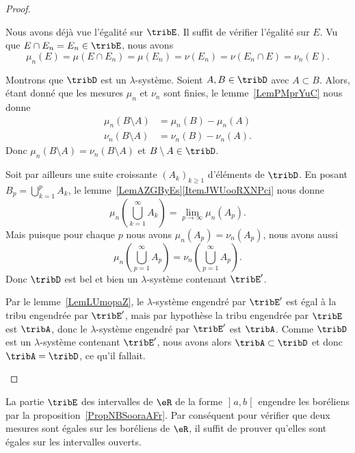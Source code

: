 \begin{proof}
\begin{subproof}
		\spitem[\( \mu_n=\nu_n\) sur \( \tribE'\)]
		Nous avons déjà vue l'égalité sur \( \tribE\). Il suffit de vérifier l'égalité sur \( E\). Vu que \( E\cap E_n=E_n\in\tribE\), nous avons
		\begin{equation}
			\mu_n(E)=\mu(E\cap E_n)=\mu(E_n)=\nu(E_n)=\nu(E_n\cap E)=\nu_n(E).
		\end{equation}

		Montrons que \( \tribD\) est un \( \lambda\)-système. Soient \( A,B\in\tribD\) avec \( A\subset B\). Alors, étant donné que les mesures \( \mu_n\) et \( \nu_n\) sont finies, le lemme~\ref{LemPMprYuC} nous donne
		\begin{subequations}
			\begin{align}
				\mu_n(B\setminus A) & =\mu_n(B)-\mu_n(A)  \\
				\nu_n(B\setminus A) & =\nu_n(B)-\nu_n(A).
			\end{align}
		\end{subequations}
		Donc \( \mu_n(B\setminus A)=\nu_n(B\setminus A)\) et \( B\setminus A\in\tribD\).

		Soit par ailleurs une suite croissante \( (A_k)_{k\geq 1}\) d'éléments de \( \tribD\). En posant \( B_p=\bigcup_{k=1}^pA_k\), le lemme~\ref{LemAZGByEs}\ref{ItemJWUooRXNPci} nous donne
		\begin{equation}
			\mu_n(\bigcup_{k=1}^{\infty}A_k)=\lim_{p\to \infty} \mu_n(A_p).
		\end{equation}
		Mais puisque pour chaque \( p\) nous avons \( \mu_n(A_p)=\nu_n(A_p)\), nous avons aussi
		\begin{equation}
			\mu_n(\bigcup_{p=1}^{\infty}A_p)=\nu_n(\bigcup_{p=1}^{\infty}A_p).
		\end{equation}
		Donc \( \tribD\) est bel et bien un \( \lambda\)-système contenant \( \tribE'\).

		\spitem[Conclusion]
		Par le lemme~\ref{LemLUmopaZ}, le \( \lambda\)-système engendré par \( \tribE'\) est égal à la tribu engendrée par \( \tribE'\), mais par hypothèse la tribu engendrée par \( \tribE\) est \( \tribA\), donc le \( \lambda\)-système engendré par \( \tribE'\) est \( \tribA\). Comme \( \tribD\) est un \( \lambda\)-système contenant \( \tribE'\), nous avons alors \( \tribA\subset\tribD\) et donc \( \tribA=\tribD\), ce qu'il fallait.
	\end{subproof}
\end{proof}

\begin{example}\label{ExDMPoohtNAj}
	La partie \( \tribE\) des intervalles de \( \eR\) de la forme \( \mathopen] a , b \mathclose[\) engendre les boréliens par la proposition~\ref{PropNBSooraAFr}. Par conséquent pour vérifier que deux mesures sont égales sur les boréliens de \( \eR\), il suffit de prouver qu'elles sont égales sur les intervalles ouverts.
\end{example}

